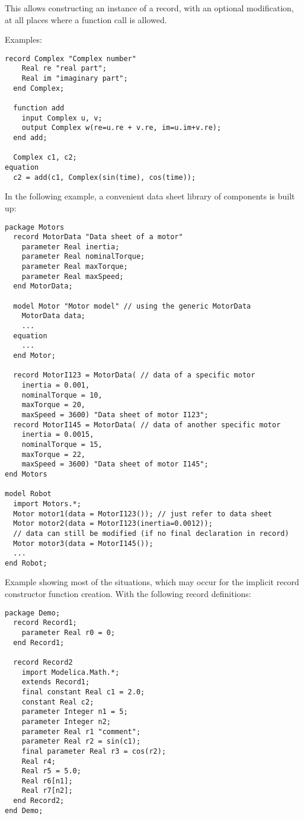 \begin{nonnormative}
This allows constructing an instance of a record, with an
optional modification, at all places where a function call is allowed.

Examples:
\begin{lstlisting}[language=modelica]
  record Complex "Complex number"
    Real re "real part";
    Real im "imaginary part";
  end Complex;

  function add
    input Complex u, v;
    output Complex w(re=u.re + v.re, im=u.im+v.re);
  end add;

  Complex c1, c2;
equation
  c2 = add(c1, Complex(sin(time), cos(time));
\end{lstlisting}

In the following example, a convenient data sheet library of
components is built up:
\begin{lstlisting}[language=modelica]
package Motors
  record MotorData "Data sheet of a motor"
    parameter Real inertia;
    parameter Real nominalTorque;
    parameter Real maxTorque;
    parameter Real maxSpeed;
  end MotorData;

  model Motor "Motor model" // using the generic MotorData
    MotorData data;
    ...
  equation
    ...
  end Motor;

  record MotorI123 = MotorData( // data of a specific motor
    inertia = 0.001,
    nominalTorque = 10,
    maxTorque = 20,
    maxSpeed = 3600) "Data sheet of motor I123";
  record MotorI145 = MotorData( // data of another specific motor
    inertia = 0.0015,
    nominalTorque = 15,
    maxTorque = 22,
    maxSpeed = 3600) "Data sheet of motor I145";
end Motors

model Robot
  import Motors.*;
  Motor motor1(data = MotorI123()); // just refer to data sheet
  Motor motor2(data = MotorI123(inertia=0.0012));
  // data can still be modified (if no final declaration in record)
  Motor motor3(data = MotorI145());
  ...
end Robot;
\end{lstlisting}

Example showing most of the situations, which may occur for the
implicit record constructor function creation. With the following record
definitions:
\begin{lstlisting}[language=modelica]
package Demo;
  record Record1;
    parameter Real r0 = 0;
  end Record1;

  record Record2
    import Modelica.Math.*;
    extends Record1;
    final constant Real c1 = 2.0;
    constant Real c2;
    parameter Integer n1 = 5;
    parameter Integer n2;
    parameter Real r1 "comment";
    parameter Real r2 = sin(c1);
    final parameter Real r3 = cos(r2);
    Real r4;
    Real r5 = 5.0;
    Real r6[n1];
    Real r7[n2];
  end Record2;
end Demo;
\end{lstlisting}


\end{nonnormative}
